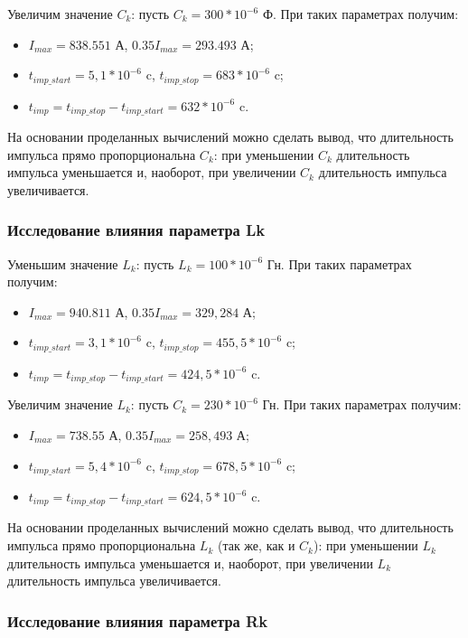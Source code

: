 Увеличим значение $C_k$: пусть $C_k = 300 * 10^{-6}$ Ф. При таких параметрах получим:
\begin{itemize}
	\item $I_{max} = 838.551$ А, $0.35I_{max} = 293.493$ А;
	\item $t_{imp\_start} = 5,1 * 10^{-6}$ c, $t_{imp\_stop} = 683 * 10^{-6}$ c;
	\item $t_{imp} = t_{imp\_stop} - t_{imp\_start} = 632 * 10^{-6}$ c.
\end{itemize}

На основании проделанных вычислений можно сделать вывод, что длительность импульса прямо пропорциональна $C_k$: при уменьшении $C_k$ длительность импульса уменьшается и, наоборот, при увеличении $C_k$ длительность импульса увеличивается.

\subsubsection{Исследование влияния параметра Lk}

Уменьшим значение $L_k$: пусть $L_k = 100 * 10^{-6}$ Гн. При таких параметрах получим:
\begin{itemize}
	\item $I_{max} = 940.811$ А, $0.35I_{max} = 329,284$ А;
	\item $t_{imp\_start} = 3,1 * 10^{-6}$ c, $t_{imp\_stop} = 455,5 * 10^{-6}$ c;
	\item $t_{imp} = t_{imp\_stop} - t_{imp\_start} = 424,5 * 10^{-6}$ c.
\end{itemize}


Увеличим значение $L_k$: пусть $C_k = 230 * 10^{-6}$ Гн. При таких параметрах получим:
\begin{itemize}
	\item $I_{max} = 738.55$ А, $0.35I_{max} = 258,493$ А;
	\item $t_{imp\_start} = 5,4 * 10^{-6}$ c, $t_{imp\_stop} = 678,5 * 10^{-6}$ c;
	\item $t_{imp} = t_{imp\_stop} - t_{imp\_start} = 624,5 * 10^{-6}$ c.
\end{itemize}

На основании проделанных вычислений можно сделать вывод, что длительность импульса прямо пропорциональна $L_k$ (так же, как и $C_k$): при уменьшении $L_k$ длительность импульса уменьшается и, наоборот, при увеличении $L_k$ длительность импульса увеличивается.


\subsubsection{Исследование влияния параметра Rk}

